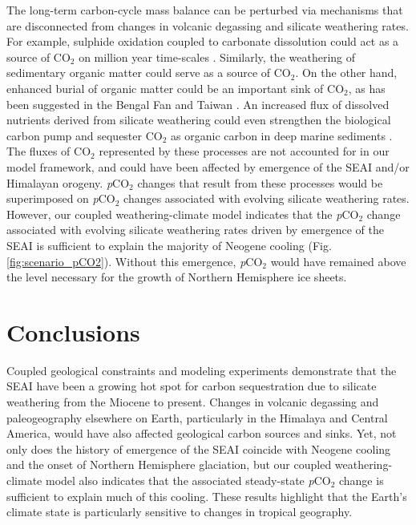 \documentclass[9pt,twocolumn,twoside,lineno]{pnas-new}
\newcommand{\pCOtwo}{\textit{p}CO$_{2}$\xspace}
\newcommand{\COtwo}{CO$_{2}$\xspace}
\begin{document}
The long-term carbon-cycle mass balance can be perturbed via mechanisms that are disconnected from changes in volcanic degassing and silicate weathering rates. For example, sulphide oxidation coupled to carbonate dissolution could act as a source of \COtwo on million year time-scales \cite{Torres2014a}. Similarly, the weathering of sedimentary organic matter could serve as a source of \COtwo \cite{Hilton2014a}. On the other hand, enhanced burial of organic matter could be an important sink of \COtwo, as has been suggested in the Bengal Fan \cite{Galy2007a} and Taiwan \cite{Kao2014a}. An increased flux of dissolved nutrients derived from silicate weathering could even strengthen the biological carbon pump and sequester \COtwo as organic carbon in deep marine sediments \cite{Hartmann2013a}. The fluxes of \COtwo represented by these processes are not accounted for in our model framework, and could have been affected by emergence of the SEAI and/or Himalayan orogeny. \pCOtwo changes that result from these processes would be superimposed on \pCOtwo changes associated with evolving silicate weathering rates. However, our coupled weathering-climate model indicates that the \pCOtwo change associated with evolving silicate weathering rates driven by emergence of the SEAI is sufficient to explain the majority of Neogene cooling (Fig. \ref{fig:scenario_pCO2}). Without this emergence, \pCOtwo would have remained above the level necessary for the growth of Northern Hemisphere ice sheets.

\section*{Conclusions}

Coupled geological constraints and modeling experiments demonstrate that the SEAI have been a growing hot spot for carbon sequestration due to silicate weathering from the Miocene to present. Changes in volcanic degassing and paleogeography elsewhere on Earth, particularly in the Himalaya and Central America, would have also affected geological carbon sources and sinks. Yet, not only does the history of emergence of the SEAI coincide with Neogene cooling and the onset of Northern Hemisphere glaciation, but our coupled weathering-climate model also indicates that the associated steady-state \pCOtwo change is sufficient to explain much of this cooling. These results highlight that the Earth's climate state is particularly sensitive to changes in tropical geography.
\end{document}
